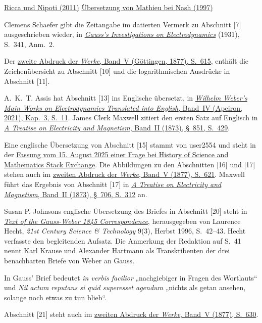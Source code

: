 \medskip\noindent
\href{https://webhomes.maths.ed.ac.uk/~v1ranick/papers/ricca.pdf#page=3}{Ricca und Nipoti (2011)}\quad
\href{https://arxiv.org/abs/hep-th/9709135v3}{Übersetzung von Mathieu bei Nash (1997)}
\par\medskip\noindent Clemens Schaefer gibt die Zeitangabe im datierten Vermerk zu Abschnitt [7] ausgeschrieben wieder, in \href{https://www.nature.com/articles/128339a0}{\textit{Gauss’s Investigations on Electrodynamics}} (1931), S.~341, Anm.~2.
\par\medskip\noindent Der \href{https://archive.org/details/Werkecarlf05gausrich/page/615/mode/1up}{zweite Abdruck der \textit{Werke}, Band~V (Göttingen, 1877), S.~615}, enthält die Zeichenübersicht zu Abschnitt [10] und die logarithmischen Ausdrücke in Abschnitt [11].
\par\medskip\noindent A.~K.~T. Assis hat Abschnitt [13] ins Englische übersetzt, in \href{https://www.ifi.unicamp.br/~assis/Weber-in-English-Vol-4.pdf#page=14}{\textit{Wilhelm Weber’s Main Works on Electrodynamics Translated into English}, Band~IV (Apeiron, 2021), Kap.~3, S.~11}. James Clerk Maxwell zitiert den ersten Satz auf Englisch in \href{https://en.wikisource.org/wiki/Page:A_Treatise_on_Electricity_and_Magnetism_-_Volume_2.djvu/461}{\textit{A Treatise on Electricity and Magnetism}, Band~II (1873), §~851, S.~429}.
\par\medskip\noindent Eine englische Übersetzung von Abschnitt [15] stammt von user2554 und steht in der \href{https://hsm.stackexchange.com/questions/7503/several-questions-about-gausss-contributions-to-electromagnetism}{Fassung vom 15. August 2025 einer Frage bei History of Science and Mathematics Stack Exchange}. Die Abbildungen zu den Abschnitten [16] und [17] stehen auch im \href{https://archive.org/details/Werkecarlf05gausrich/page/621/mode/1up}{zweiten Abdruck der \textit{Werke}, Band~V (1877), S.~621}. Maxwell führt das Ergebnis von Abschnitt [17] in \href{https://en.wikisource.org/wiki/Page:A_Treatise_on_Electricity_and_Magnetism_-_Volume_2.djvu/344}{\textit{A Treatise on Electricity and Magnetism}, Band~II (1873), §~706, S.~312} an.
\par\medskip\noindent Susan P. Johnsons englische Übersetzung des Briefes in Abschnitt [20] steht in \href{https://21sci-tech.com/articles/Atomic_Science.pdf#page=22}{\textit{Text of the Gauss-Weber 1845 Correspondence}}, herausgegeben von Laurence Hecht, \textit{21st Century Science \& Technology} 9(3), Herbst 1996, S.~42--43. Hecht verfasste den begleitenden Aufsatz. Die Anmerkung der Redaktion auf S.~41 nennt Karl Krause und Alexander Hartmann als Transkribenten der drei benachbarten Briefe von Weber an Gauss.
\par\smallskip\noindent In Gauss’ Brief bedeutet \textit{in verbis facilior} „nachgiebiger in Fragen des Wortlauts“ und \textit{Nil actum reputans si quid superesset agendum} „nichts als getan ansehen, solange noch etwas zu tun blieb“.
\par\smallskip\noindent Abschnitt [21] steht auch im \href{https://archive.org/download/Werkecarlf05gausrich/page/n641}{zweiten Abdruck der \textit{Werke}, Band~V (1877), S.~630}.
\clearpage
